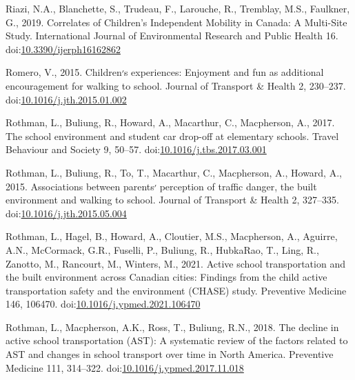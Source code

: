 \documentclass[]{elsarticle} %
\begin{document}
\leavevmode\hypertarget{ref-riaziCorrelatesChildrenIndependent2019}{}%
Riazi, N.A., Blanchette, S., Trudeau, F., Larouche, R., Tremblay, M.S.,
Faulkner, G., 2019. Correlates of Children's Independent Mobility in
Canada: A Multi-Site Study. International Journal of Environmental
Research and Public Health 16.
doi:\href{https://doi.org/10.3390/ijerph16162862}{10.3390/ijerph16162862}

\leavevmode\hypertarget{ref-romeroChildrenExperiencesEnjoyment2015}{}%
Romero, V., 2015. Children׳s experiences: Enjoyment and fun as
additional encouragement for walking to school. Journal of Transport \&
Health 2, 230--237.
doi:\href{https://doi.org/10.1016/j.jth.2015.01.002}{10.1016/j.jth.2015.01.002}

\leavevmode\hypertarget{ref-rothmanSchoolEnvironmentStudent2017}{}%
Rothman, L., Buliung, R., Howard, A., Macarthur, C., Macpherson, A.,
2017. The school environment and student car drop-off at elementary
schools. Travel Behaviour and Society 9, 50--57.
doi:\href{https://doi.org/10.1016/j.tbs.2017.03.001}{10.1016/j.tbs.2017.03.001}

\leavevmode\hypertarget{ref-rothmanAssociationsParentsPerception2015}{}%
Rothman, L., Buliung, R., To, T., Macarthur, C., Macpherson, A., Howard,
A., 2015. Associations between parents׳ perception of traffic danger,
the built environment and walking to school. Journal of Transport \&
Health 2, 327--335.
doi:\href{https://doi.org/10.1016/j.jth.2015.05.004}{10.1016/j.jth.2015.05.004}

\leavevmode\hypertarget{ref-rothmanActiveSchoolTransportation2021}{}%
Rothman, L., Hagel, B., Howard, A., Cloutier, M.S., Macpherson, A.,
Aguirre, A.N., McCormack, G.R., Fuselli, P., Buliung, R., HubkaRao, T.,
Ling, R., Zanotto, M., Rancourt, M., Winters, M., 2021. Active school
transportation and the built environment across Canadian cities:
Findings from the child active transportation safety and the environment
(CHASE) study. Preventive Medicine 146, 106470.
doi:\href{https://doi.org/10.1016/j.ypmed.2021.106470}{10.1016/j.ypmed.2021.106470}

\leavevmode\hypertarget{ref-rothmanDeclineActiveSchool2018}{}%
Rothman, L., Macpherson, A.K., Ross, T., Buliung, R.N., 2018. The
decline in active school transportation (AST): A systematic review of
the factors related to AST and changes in school transport over time in
North America. Preventive Medicine 111, 314--322.
doi:\href{https://doi.org/10.1016/j.ypmed.2017.11.018}{10.1016/j.ypmed.2017.11.018}
\end{document}
